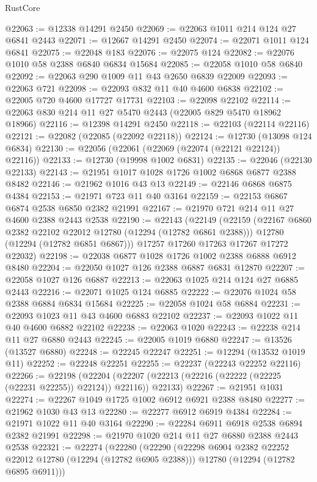 \begin{lexlean}{RustCore}
\begin{coremodule}
@22063 := @12338 @14291 @2450
@22069 := @22063 @1011 @214 @124 @27 @6841 @2443
@22071 := @12667 @14291 @2450
@22074 := @22071 @1011 @124 @6841
@22075 := @22048 @183
@22076 := @22075 @124
@22082 := @22076 @1010 @58 @2388 @6840 @6834 @15684
@22085 := @22058 @1010 @58 @6840
@22092 := @22063 @290 @1009 @11 @43 @2650 @6839 @22009
@22093 := @22063 @721
@22098 := @22093 @832 @11 @40 @4600 @6838
@22102 := @22005 @720 @4600 @17727 @17731
@22103 := @22098 @22102
@22114 := @22063 @830 @214 @11 @27 @5470 @2443 (@22005 @829 @5470 @18962 @18966)
@22116 := @12398 @14291 @2450
@22118 := @22103 (@22114 @22116)
@22121 := @22082 (@22085 (@22092 @22118))
@22124 := @12730 (@13098 @124 @6834)
@22130 := @22056 (@22061 (@22069 (@22074 (@22121 @22124)) @22116))
@22133 := @12730 (@19998 @1002 @6831)
@22135 := @22046 (@22130 @22133)
@22143 := @21951 @1017 @1028 @1726 @1002 @6868 @6877 @2388 @8482
@22146 := @21962 @1016 @43 @13
@22149 := @22146 @6868 @6875 @4384
@22153 := @21971 @723 @11 @40 @3164
@22159 := @22153 @6867 @6874 @2538 @6850 @2382 @21991
@22167 := @21970 @721 @214 @11 @27 @4600 @2388 @2443 @2538
@22190 := @22143
    (@22149
      (@22159
        (@22167 @6860 @2382 @22102 @22012 @12780 (@12294 (@12782 @6861 @2388)))
        @12780
        (@12294 (@12782 @6851 @6867)))
      @17257
      @17260
      @17263
      @17267
      @17272
      @22032)
@22198 := @22038 @6877 @1028 @1726 @1002 @2388 @6888 @6912 @8480
@22204 := @22050 @1027 @126 @2388 @6887 @6831 @12870
@22207 := @22058 @1027 @126 @6887
@22213 := @22063 @1025 @214 @124 @27 @6885 @2443
@22216 := @22071 @1025 @124 @6885
@22222 := @22076 @1024 @58 @2388 @6884 @6834 @15684
@22225 := @22058 @1024 @58 @6884
@22231 := @22093 @1023 @11 @43 @4600 @6883 @22102
@22237 := @22093 @1022 @11 @40 @4600 @6882 @22102
@22238 := @22063 @1020
@22243 := @22238 @214 @11 @27 @6880 @2443
@22245 := @22005 @1019 @6880
@22247 := @13526 (@13527 @6880)
@22248 := @22245 @22247
@22251 := @12294 (@13532 @1019 @11)
@22252 := @22248 @22251
@22255 := @22237 (@22243 @22252 @22116)
@22266 := @22198
    (@22204 (@22207 (@22213 (@22216 (@22222 (@22225 (@22231 @22255)) @22124)) @22116)) @22133)
@22267 := @21951 @1031
@22274 := @22267 @1049 @1725 @1002 @6912 @6921 @2388 @8480
@22277 := @21962 @1030 @43 @13
@22280 := @22277 @6912 @6919 @4384
@22284 := @21971 @1022 @11 @40 @3164
@22290 := @22284 @6911 @6918 @2538 @6894 @2382 @21991
@22298 := @21970 @1020 @214 @11 @27 @6880 @2388 @2443 @2538
@22321 := @22274
    (@22280
      (@22290
        (@22298 @6904 @2382 @22252 @22012 @12780 (@12294 (@12782 @6905 @2388)))
        @12780
        (@12294 (@12782 @6895 @6911)))

\end{coremodule}
\end{lexlean}
